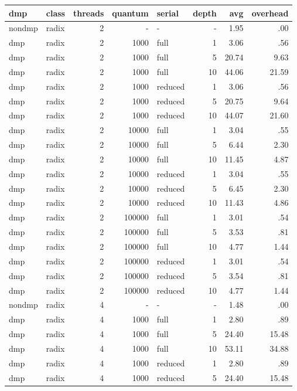 \begin{center}
\begin{small}
\begin{longtable}{llrrlrrr}
\hline
dmp & class & threads & quantum & serial & depth & avg & overhead\\
\hline
nondmp & radix & 2 & - & - & - & 1.95 & .00\\
dmp & radix & 2 & 1000 & full & 1 & 3.06 & .56\\
dmp & radix & 2 & 1000 & full & 5 & 20.74 & 9.63\\
dmp & radix & 2 & 1000 & full & 10 & 44.06 & 21.59\\
dmp & radix & 2 & 1000 & reduced & 1 & 3.06 & .56\\
dmp & radix & 2 & 1000 & reduced & 5 & 20.75 & 9.64\\
dmp & radix & 2 & 1000 & reduced & 10 & 44.07 & 21.60\\
dmp & radix & 2 & 10000 & full & 1 & 3.04 & .55\\
dmp & radix & 2 & 10000 & full & 5 & 6.44 & 2.30\\
dmp & radix & 2 & 10000 & full & 10 & 11.45 & 4.87\\
dmp & radix & 2 & 10000 & reduced & 1 & 3.04 & .55\\
dmp & radix & 2 & 10000 & reduced & 5 & 6.45 & 2.30\\
dmp & radix & 2 & 10000 & reduced & 10 & 11.43 & 4.86\\
dmp & radix & 2 & 100000 & full & 1 & 3.01 & .54\\
dmp & radix & 2 & 100000 & full & 5 & 3.53 & .81\\
dmp & radix & 2 & 100000 & full & 10 & 4.77 & 1.44\\
dmp & radix & 2 & 100000 & reduced & 1 & 3.01 & .54\\
dmp & radix & 2 & 100000 & reduced & 5 & 3.54 & .81\\
dmp & radix & 2 & 100000 & reduced & 10 & 4.77 & 1.44\\
nondmp & radix & 4 & - & - & - & 1.48 & .00\\
dmp & radix & 4 & 1000 & full & 1 & 2.80 & .89\\
dmp & radix & 4 & 1000 & full & 5 & 24.40 & 15.48\\
dmp & radix & 4 & 1000 & full & 10 & 53.11 & 34.88\\
dmp & radix & 4 & 1000 & reduced & 1 & 2.80 & .89\\
dmp & radix & 4 & 1000 & reduced & 5 & 24.40 & 15.48\\

\end{longtable}
\end{small}
\end{center}
